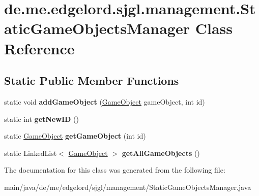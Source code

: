 \hypertarget{classde_1_1me_1_1edgelord_1_1sjgl_1_1management_1_1_static_game_objects_manager}{}\section{de.\+me.\+edgelord.\+sjgl.\+management.\+Static\+Game\+Objects\+Manager Class Reference}
\label{classde_1_1me_1_1edgelord_1_1sjgl_1_1management_1_1_static_game_objects_manager}
\subsection*{Static Public Member Functions}
\begin{DoxyCompactItemize}
\item 
\mbox{\label{classde_1_1me_1_1edgelord_1_1sjgl_1_1management_1_1_static_game_objects_manager_ab1d14bb80736c2e878b20ce976539e97}} 
static void {\bfseries add\+Game\+Object} (\mbox{\hyperlink{classde_1_1me_1_1edgelord_1_1sjgl_1_1gameobject_1_1_game_object}{Game\+Object}} game\+Object, int id)
\item 
\mbox{\label{classde_1_1me_1_1edgelord_1_1sjgl_1_1management_1_1_static_game_objects_manager_a9058185c587877cd5a9c3047ae6548ce}} 
static int {\bfseries get\+New\+ID} ()
\item 
\mbox{\label{classde_1_1me_1_1edgelord_1_1sjgl_1_1management_1_1_static_game_objects_manager_a6617d8d67d0d377dafec4e109ae07795}} 
static \mbox{\hyperlink{classde_1_1me_1_1edgelord_1_1sjgl_1_1gameobject_1_1_game_object}{Game\+Object}} {\bfseries get\+Game\+Object} (int id)
\item 
\mbox{\label{classde_1_1me_1_1edgelord_1_1sjgl_1_1management_1_1_static_game_objects_manager_a5df5e1122bbcc80c35cf79db73c1c4e8}} 
static Linked\+List$<$ \mbox{\hyperlink{classde_1_1me_1_1edgelord_1_1sjgl_1_1gameobject_1_1_game_object}{Game\+Object}} $>$ {\bfseries get\+All\+Game\+Objects} ()
\end{DoxyCompactItemize}


The documentation for this class was generated from the following file\+:\begin{DoxyCompactItemize}
\item 
main/java/de/me/edgelord/sjgl/management/Static\+Game\+Objects\+Manager.\+java\end{DoxyCompactItemize}
